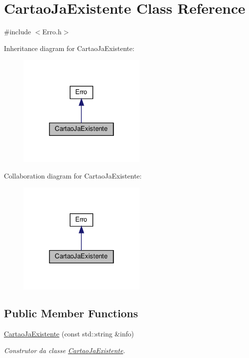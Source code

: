 \hypertarget{classCartaoJaExistente}{}\section{Cartao\+Ja\+Existente Class Reference}
\label{classCartaoJaExistente}


{\ttfamily \#include $<$Erro.\+h$>$}



Inheritance diagram for Cartao\+Ja\+Existente\+:
\nopagebreak
\begin{figure}[H]
\begin{center}
\leavevmode
\includegraphics[width=178pt]{classCartaoJaExistente__inherit__graph}
\end{center}
\end{figure}


Collaboration diagram for Cartao\+Ja\+Existente\+:
\nopagebreak
\begin{figure}[H]
\begin{center}
\leavevmode
\includegraphics[width=178pt]{classCartaoJaExistente__coll__graph}
\end{center}
\end{figure}
\subsection*{Public Member Functions}
\begin{DoxyCompactItemize}
\item 
\hyperlink{classCartaoJaExistente_ab3efa558a7577d97eff97b81aabc1647}{Cartao\+Ja\+Existente} (const std\+::string \&info)
\begin{DoxyCompactList}\small\item\em Construtor da classe \hyperlink{classCartaoJaExistente}{Cartao\+Ja\+Existente}. \end{DoxyCompactList}\end{DoxyCompactItemize}


